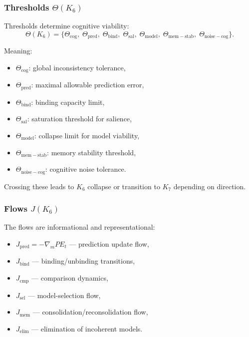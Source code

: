 \subsubsection{Thresholds \texorpdfstring{$\Theta(K_6)$}{\Theta(K_6)}}

Thresholds determine cognitive viability:
\[
\Theta(K_6)=
\{
\Theta_{\mathrm{cog}},\;
\Theta_{\mathrm{pred}},\;
\Theta_{\mathrm{bind}},\;
\Theta_{\mathrm{sal}},\;
\Theta_{\mathrm{model}},\;
\Theta_{\mathrm{mem-stab}},\;
\Theta_{\mathrm{noise-cog}}
\}.
\]

Meaning:
\begin{itemize}
    \item $\Theta_{\mathrm{cog}}$: global inconsistency tolerance,
    \item $\Theta_{\mathrm{pred}}$: maximal allowable prediction error,
    \item $\Theta_{\mathrm{bind}}$: binding capacity limit,
    \item $\Theta_{\mathrm{sal}}$: saturation threshold for salience,
    \item $\Theta_{\mathrm{model}}$: collapse limit for model viability,
    \item $\Theta_{\mathrm{mem-stab}}$: memory stability threshold,
    \item $\Theta_{\mathrm{noise-cog}}$: cognitive noise tolerance.
\end{itemize}

Crossing these leads to $K_6$ collapse or transition to $K_7$ depending on direction.

\subsubsection{Flows \texorpdfstring{$J(K_6)$}{J(K_6)}}

The flows are informational and representational:

\begin{itemize}
    \item $J_{\mathrm{pred}} = -\nabla_m PE_t$ — prediction update flow,
    \item $J_{\mathrm{bind}}$ — binding/unbinding transitions,
    \item $J_{\mathrm{cmp}}$ — comparison dynamics,
    \item $J_{\mathrm{sel}}$ — model-selection flow,
    \item $J_{\mathrm{mem}}$ — consolidation/reconsolidation flow,
    \item $J_{\mathrm{elim}}$ — elimination of incoherent models.
\end{itemize}

